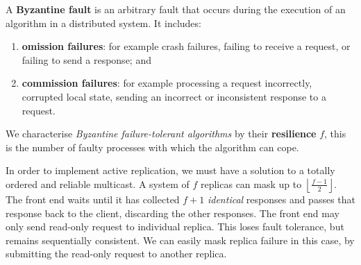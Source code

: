 \begin{definition}
    A \textbf{Byzantine fault} is an arbitrary fault that occurs during
    the execution of an algorithm in a distributed system.
    It includes:
    \begin{enumerate}
        \item \textbf{omission failures}: for example
            crash failures, failing to receive a request, or failing to send a
            response; and
        \item \textbf{commission failures}: for example
            processing a request incorrectly, corrupted local state,
            sending an incorrect or inconsistent response to a request.
    \end{enumerate}
\end{definition}

We characterise \emph{Byzantine failure-tolerant algorithms} by
their \textbf{resilience} $f$,
this is the number of faulty processes with which the algorithm can cope.

In order to implement active replication, 
we must have a solution to a totally ordered and reliable multicast.
A system of $f$ replicas can mask up to 
$\left\lfloor \frac{f - 1}{2} \right\rfloor$.
The front end waits until it has collected $f + 1$ \emph{identical}
responses and passes that response back to the client, discarding
the other responses.
The front end may only send read-only request to individual replica.
This loses fault tolerance, but remains sequentially consistent.
We can easily mask replica failure in this case,
by submitting the read-only request to another replica.
